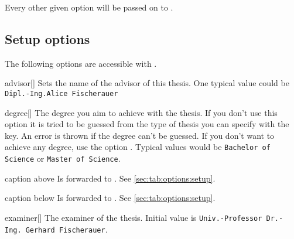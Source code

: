 Every other given option will be passed on to .
\subsection{Setup options}\label{sec:thesis:setup}%
The following options are accessible with .
\begin{describeopt}{advisor}[]
  Sets the name of the advisor of this thesis. One typical value could be
  \texttt{Dipl.-Ing.\@ Alice Fischerauer}
\end{describeopt}
\begin{describeopt}{degree}[]
  The degree you aim to achieve with the thesis. If you don't use this option it
  is tried to be guessed from the type of thesis you can specify with the
   key. An error is thrown if the degree can't be guessed. If you
  don't want to achieve any degree, use the option . Typical
  values would be \verb|Bachelor of Science| or \verb|Master of Science|.
\end{describeopt}
\begin{describeopt}{caption above}
  Is forwarded to . See \autoref{sec:tab:options:setup}.
\end{describeopt}
\begin{describeopt}{caption below}
  Is forwarded to . See \autoref{sec:tab:options:setup}.
\end{describeopt}
\begin{describeopt}{examiner}[]
  The examiner of the thesis. Initial value is
  \texttt{Univ.-Professor Dr.-Ing.}\hskip0pt\ \texttt{Gerhard Fischerauer}.
\end{describeopt}
